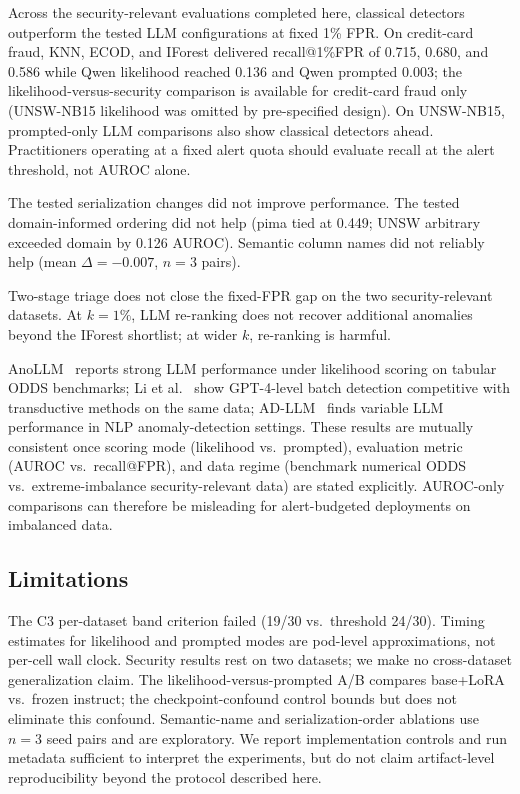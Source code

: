 \documentclass[conference]{IEEEtran}
\begin{document}
Across the security-relevant evaluations completed here, classical detectors outperform the tested LLM configurations at fixed 1\% FPR.
On credit-card fraud, KNN, ECOD, and IForest delivered recall@1\%FPR of 0.715, 0.680, and 0.586 while Qwen likelihood reached 0.136 and Qwen prompted 0.003; the likelihood-versus-security comparison is available for credit-card fraud only (UNSW-NB15 likelihood was omitted by pre-specified design).
On UNSW-NB15, prompted-only LLM comparisons also show classical detectors ahead.
Practitioners operating at a fixed alert quota should evaluate recall at the alert threshold, not AUROC alone.

The tested serialization changes did not improve performance.
The tested domain-informed ordering did not help (pima tied at 0.449; UNSW arbitrary exceeded domain by 0.126 AUROC).
Semantic column names did not reliably help (mean $\Delta=-0.007$, $n=3$ pairs).

Two-stage triage does not close the fixed-FPR gap on the two security-relevant datasets.
At $k=1\%$, LLM re-ranking does not recover additional anomalies beyond the IForest shortlist; at wider $k$, re-ranking is harmful.

AnoLLM~\cite{tsai2025anollm} reports strong LLM performance under likelihood scoring on tabular ODDS benchmarks; Li et al.~\cite{li2024tabularllm} show GPT-4-level batch detection competitive with transductive methods on the same data; AD-LLM~\cite{yang2025adllm} finds variable LLM performance in NLP anomaly-detection settings. These results are mutually consistent once scoring mode (likelihood vs.\ prompted), evaluation metric (AUROC vs.\ recall@FPR), and data regime (benchmark numerical ODDS vs.\ extreme-imbalance security-relevant data) are stated explicitly.
AUROC-only comparisons can therefore be misleading for alert-budgeted deployments on imbalanced data.

\subsection{Limitations}
The C3 per-dataset band criterion failed (19/30 vs.\ threshold 24/30).
Timing estimates for likelihood and prompted modes are pod-level approximations, not per-cell wall clock.
Security results rest on two datasets; we make no cross-dataset generalization claim.
The likelihood-versus-prompted A/B compares base+LoRA vs.\ frozen instruct; the checkpoint-confound control bounds but does not eliminate this confound.
Semantic-name and serialization-order ablations use $n=3$ seed pairs and are exploratory.
We report implementation controls and run metadata sufficient to interpret the experiments, but do not claim artifact-level reproducibility beyond the protocol described here.
\end{document}
